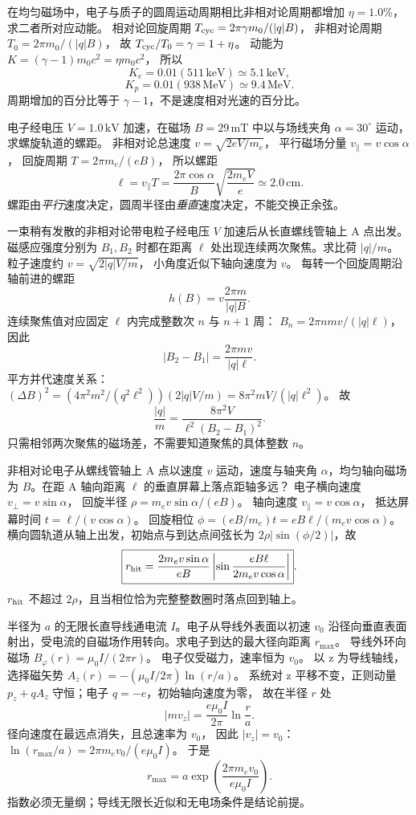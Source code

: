 在均匀磁场中，电子与质子的圆周运动周期相比非相对论周期都增加 $\eta=1.0\%$，求二者所对应动能。
\exsolution
相对论回旋周期
$T_{\rm cyc}=2\pi\gamma m_0/(|q|B)$，
非相对论周期
$T_0=2\pi m_0/(|q|B)$，
故 $T_{\rm cyc}/T_0=\gamma=1+\eta$。
动能为
$K=(\gamma-1)m_0c^2=\eta m_0c^2$，
所以
\[
\boxed{K_e=0.01(511\,\mathrm{keV})
\simeq5.1\,\mathrm{keV}},
\]
\[
\boxed{K_p=0.01(938\,\mathrm{MeV})
\simeq9.4\,\mathrm{MeV}}.
\]
\excheck 周期增加的百分比等于 $\gamma-1$，不是速度相对光速的百分比。

电子经电压 $V=1.0\,\mathrm{kV}$ 加速，在磁场 $B=29\,\mathrm{mT}$ 中以与场线夹角 $\alpha=30^\circ$ 运动，求螺旋轨道的螺距。
\exsolution
非相对论总速度
$v=\sqrt{2eV/m_e}$，
平行磁场分量
$v_\parallel=v\cos\alpha$，
回旋周期
$T=2\pi m_e/(eB)$，
所以螺距
\[
\boxed{\ell=v_\parallel T
=\frac{2\pi\cos\alpha}{B}
\sqrt{\frac{2m_eV}{e}}
\simeq2.0\,\mathrm{cm}}.
\]
\excheck 螺距由\emph{平行}速度决定，圆周半径由\emph{垂直}速度决定，不能交换正余弦。

一束稍有发散的非相对论带电粒子经电压 $V$ 加速后从长直螺线管轴上 A 点出发。磁感应强度分别为 $B_1,B_2$ 时都在距离 $\ell$ 处出现连续两次聚焦。求比荷 $|q|/m$。
\exsolution
粒子速度约
$v=\sqrt{2|q|V/m}$，
小角度近似下轴向速度为 $v$。
每转一个回旋周期沿轴前进的螺距
\[
h(B)=v\frac{2\pi m}{|q|B}.
\]
连续聚焦值对应固定 $\ell$ 内完成整数次
$n$ 与 $n+1$ 周：
$B_n=2\pi n mv/(|q|\ell)$，
因此
\[
|B_2-B_1|=\frac{2\pi mv}{|q|\ell}.
\]
平方并代速度关系：
$(\Delta B)^2=
(4\pi^2m^2/(q^2\ell^2))(2|q|V/m)
=8\pi^2mV/(|q|\ell^2)$。
故
\[
\boxed{\frac{|q|}{m}=
\frac{8\pi^2V}{\ell^2(B_2-B_1)^2}}.
\]
\excheck 只需相邻两次聚焦的磁场差，不需要知道聚焦的具体整数 $n$。

非相对论电子从螺线管轴上 A 点以速度 $v$ 运动，速度与轴夹角 $\alpha$，均匀轴向磁场为 $B$。在距 A 轴向距离 $\ell$ 的垂直屏幕上落点距轴多远？
\exsolution
电子横向速度 $v_\perp=v\sin\alpha$，
回旋半径
$\rho=m_ev\sin\alpha/(eB)$。
轴向速度 $v_\parallel=v\cos\alpha$，
抵达屏幕时间
$t=\ell/(v\cos\alpha)$。
回旋相位
$\phi=(eB/m_e)t=eB\ell/(m_ev\cos\alpha)$。
横向圆轨道从轴上出发，初始点与到达点间弦长为
$2\rho|\sin(\phi/2)|$，故
\[
\boxed{r_{\rm hit}=
\frac{2m_ev\sin\alpha}{eB}
\left|\sin\frac{eB\ell}{2m_ev\cos\alpha}\right|}.
\]
\excheck $r_{\rm hit}$ 不超过 $2\rho$，且当相位恰为完整整数圈时落点回到轴上。

半径为 $a$ 的无限长直导线通电流 $I$。电子从导线外表面以初速 $v_0$ 沿径向垂直表面射出，受电流的自磁场作用转向。求电子到达的最大径向距离 $r_{\max}$。
\exsolution
导线外环向磁场
$B_\varphi(r)=\mu_0I/(2\pi r)$。
电子仅受磁力，速率恒为 $v_0$。
以 z 为导线轴线，选择磁矢势
$A_z(r)=-(\mu_0I/2\pi)\ln(r/a)$。
系统对 z 平移不变，正则动量
$p_z+qA_z$ 守恒；电子 $q=-e$，初始轴向速度为零，
故在半径 $r$ 处
\[
|mv_z|=\frac{e\mu_0I}{2\pi}\ln\frac ra.
\]
径向速度在最远点消失，且总速率为 $v_0$，
因此 $|v_z|=v_0$：
$\ln(r_{\max}/a)=2\pi m_ev_0/(e\mu_0I)$。
于是
\[
\boxed{r_{\max}=a\exp
\left(\frac{2\pi m_ev_0}{e\mu_0I}\right)}.
\]
\excheck 指数必须无量纲；导线无限长近似和无电场条件是结论前提。


